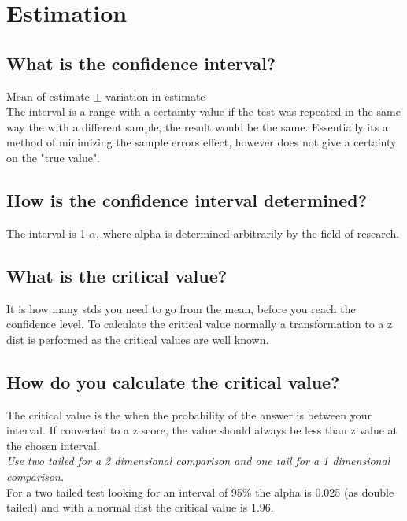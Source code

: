 \documentclass[11pt]{scrartcl} %
\begin{document}
\section{Estimation}

\subsection{What is the confidence interval?}

Mean of estimate \(\pm\) variation in estimate \\

The interval is a range with a certainty value if the test was repeated in the same way the with a different sample,
the result would be the same. Essentially its a method of minimizing the sample errors effect, however does not give
a certainty on the "true value". 

\subsection{How is the confidence interval determined?}

The interval is 1-\(\alpha\), where alpha is determined arbitrarily by the field of research.

\subsection{What is the critical value?}

It is how many stds you need to go from the mean, before you reach the confidence level. To calculate the critical value
normally a transformation to a z dist is performed as the critical values are well known.

\subsection{How do you calculate the critical value?}

The critical value is the when the probability of the answer is between your interval. If converted to a z score, the
value should always be less than z value at the chosen interval.\\

\textit{Use two tailed for a 2 dimensional comparison and one tail for a 1 dimensional comparison.}\\

For a two tailed test looking for an interval of 95\% the alpha is 0.025 (as double tailed) and 
with a normal dist the critical value is 1.96.
\end{document}
